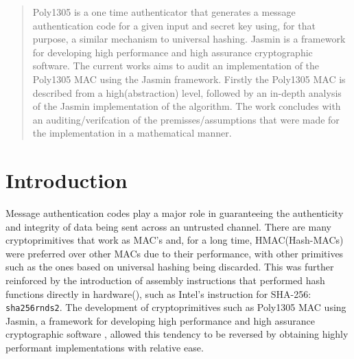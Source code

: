 \documentclass[twocolumn]{article}
\begin{document}

\begin{abstract}
    Poly1305 is a one time authenticator that generates a message authentication code for a given input and secret key using, for that purpose, a similar mechanism to
    universal hashing. Jasmin is a framework for developing high performance and high assurance cryptographic software. The current works aims to audit an implementation 
    of the Poly1305 MAC using the Jasmin framework. Firstly the Poly1305 MAC is described from a high(abstraction) level, followed by an in-depth analysis of the Jasmin 
    implementation of the algorithm. The work concludes with an auditing/verifcation of the premisses/assumptions that were made for the implementation in a mathematical
    manner.
\end{abstract}

\section{Introduction}
Message authentication codes play a major role in guaranteeing the authenticity and integrity of data being sent across an untrusted channel. There are many 
cryptoprimitives that work as MAC's and, for a long time, HMAC(Hash-MACs) were preferred over other MACs due to their performance, with other primitives such 
as the ones based on universal hashing being discarded. This was further reinforced by the introduction of assembly instructions that performed hash functions 
directly in hardware(\cite{sha_extensions}), such as Intel's instruction for SHA-256: \texttt{sha256rnds2}. The development of cryptoprimitives 
such as Poly1305 MAC using Jasmin, a framework for developing high performance and high assurance cryptographic software \cite{jasmin_paper}, allowed this tendency 
to be reversed by obtaining highly performant implementations with relative ease.
\end{document}
